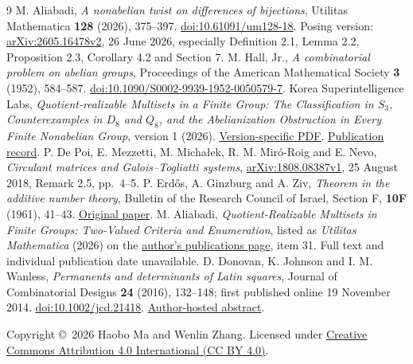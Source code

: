 \documentclass[11pt]{article}
\begin{document}
\begin{thebibliography}{9}
M. Aliabadi, \emph{A nonabelian twist on differences of bijections},
Utilitas Mathematica \textbf{128} (2026), 375--397.
\href{https://doi.org/10.61091/um128-18}{doi:10.61091/um128-18}.
Posing version: \href{https://arxiv.org/abs/2605.16478v2}{arXiv:2605.16478v2},
26 June 2026, especially Definition 2.1, Lemma 2.2,
Proposition 2.3, Corollary 4.2 and Section 7.
M. Hall, Jr., \emph{A combinatorial problem on abelian groups},
Proceedings of the American Mathematical Society \textbf{3} (1952), 584--587.
\href{https://doi.org/10.1090/S0002-9939-1952-0050579-7}{doi:10.1090/S0002-9939-1952-0050579-7}.
Korea Superintelligence Labs,
\emph{Quotient-realizable Multisets in a Finite Group:
The Classification in $S_3$, Counterexamples in $D_8$ and $Q_8$,
and the Abelianization Obstruction in Every Finite Nonabelian Group},
version 1 (2026).
\href{https://ideosphere.ai/papers/quotient-realizable-v1.pdf}{Version-specific PDF}.
\href{https://ideosphere.ai/papers/quotient-realizable}{Publication record}.
P. De Poi, E. Mezzetti, M. Micha\l ek, R. M. Mir\'o-Roig and E. Nevo,
\emph{Circulant matrices and Galois--Togliatti systems},
\href{https://arxiv.org/abs/1808.08387v1}{arXiv:1808.08387v1},
25 August 2018, Remark 2.5, pp.~4--5.
P. Erd\H{o}s, A. Ginzburg and A. Ziv,
\emph{Theorem in the additive number theory},
Bulletin of the Research Council of Israel, Section F,
\textbf{10F} (1961), 41--43.
\href{https://users.renyi.hu/~p_erdos/1961-25.pdf}{Original paper}.
M. Aliabadi, \emph{Quotient-Realizable Multisets in Finite Groups:
Two-Valued Criteria and Enumeration}, listed as \emph{Utilitas Mathematica}
(2026) on the
\href{https://mohsenmath88.wixsite.com/mohsenaliabadi/publications}{author's
publications page}, item 31. Full text and individual publication date unavailable.
D. Donovan, K. Johnson and I. M. Wanless,
\emph{Permanents and determinants of Latin squares},
Journal of Combinatorial Designs \textbf{24} (2016), 132--148;
first published online 19 November 2014.
\href{https://doi.org/10.1002/jcd.21418}{doi:10.1002/jcd.21418}.
\href{https://users.monash.edu.au/~iwanless/abstracts/perdetLS.html}{Author-hosted abstract}.
\end{thebibliography}
\medskip\noindent\small
Copyright \copyright\ 2026 Haobo Ma and Wenlin Zhang.
Licensed under \href{https://creativecommons.org/licenses/by/4.0/}{Creative Commons Attribution 4.0 International (CC BY 4.0)}.
\end{document}
